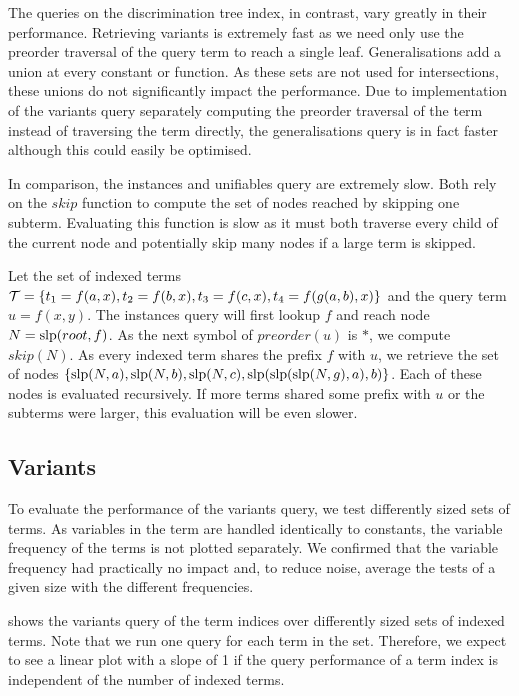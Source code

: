The queries on the discrimination tree index, in contrast, vary greatly in their performance.
Retrieving variants is extremely fast as we need only use the preorder traversal of the query term to reach a single leaf. Generalisations add a union at every constant or function. As these sets are not used for intersections, these unions do not significantly impact the performance. Due to implementation of the variants query separately computing the preorder traversal of the term instead of traversing the term directly, the generalisations query is in fact faster although this could easily be optimised.

In comparison, the instances and unifiables query are extremely slow.
Both rely on the $skip$ function to compute the set of nodes reached by skipping one subterm.
Evaluating this function is slow as it must both traverse every child of the current node and potentially skip many nodes if a large term is skipped.

\begin{exmpl}
  Let the set of indexed terms $\mathcal{T} = \{t_{1} = f(a,x), t_{2} = f(b,x), t_{3} = f(c,x), t_{4} = f(g(a,b),x)\}$ and the query term $u = f(x,y)$.
  The instances query will first lookup $f$ and reach node $N = \mathrm{slp}(root,f)$. As the next symbol of $preorder(u)$ is $*$, we compute $skip(N)$. As every indexed term shares the prefix $f$ with $u$, we retrieve the set of nodes $\{\mathrm{slp}(N,a), \mathrm{slp}(N,b), \mathrm{slp}(N,c), \mathrm{slp}(\mathrm{slp}(\mathrm{slp}(N,g),a),b)\}$. Each of these nodes is evaluated recursively.
  If more terms shared some prefix with $u$ or the subterms were larger, this evaluation will be even slower.
\end{exmpl}

\subsection{Variants}
To evaluate the performance of the variants query, we test differently sized sets of terms. As variables in the term are handled identically to constants, the variable frequency of the terms is not plotted separately. We confirmed that the variable frequency had practically no impact and, to reduce noise, average the tests of a given size with the different frequencies.

 shows the variants query of the term indices over differently sized sets of indexed terms. Note that we run one query for each term in the set. Therefore, we expect to see a linear plot with a slope of 1 if the query performance of a term index is independent of the number of indexed terms.


